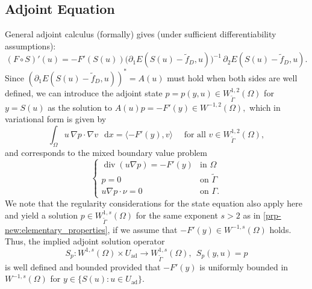 \documentclass[11pt]{article}
\newcommand*\dd{\mathop{}\!\mathrm{d}}
\newcommand{\feas}{U_{\textrm{ad}}}
\theoremstyle{definition}
\theoremstyle{remark}
\begin{document}
\subsection{Adjoint Equation}

General adjoint calculus (formally) gives (under sufficient differentiability assumptions):
\[ (F \circ S)'(u) = -
F'(S(u))
\bigl(\partial_1 E(S(u)-\tilde f_D,u)\bigr)^{-1}\,
\partial_2 E(S(u)-\tilde f_D,u).
\]
%
Since
$(\partial_1 E(S(u)-\tilde f_D,u))^* = A(u)$
must hold when both sides are well defined, we can introduce the adjoint 
state $p = p(y,u) \in W^{1,2}_{\tilde{\Gamma}}(\Omega)$ for $y = S(u)$
as the solution to
$ A(u)p = -F'(y) \in W^{-1,2}(\Omega), $
which in variational form is given by
%
\[
\int_\Omega u\,\nabla p\cdot\nabla v\,\dd x
= \langle - F'(y), v\rangle
\quad\text{ for all }v\in W^{1,2}_{\tilde{\Gamma}}(\Omega),
\]
%
and corresponds to the mixed boundary value problem
%
\begin{equation}\label{eq:adjoint}
\begin{cases}
\operatorname{div}(u\nabla p) = - F'(y)
& \text{in }\Omega\\
p = 0 &\text{on }\tilde\Gamma\\
u \nabla p\cdot\nu = 0 &\text{on }\Gamma.
\end{cases}
\end{equation}
%
We note that the regularity considerations for the state
equation also apply here and yield a solution
$p\in W^{1,s}_{\tilde\Gamma}(\Omega)$ for the same exponent $s>2$ as in \cref{prp-new:elementary_properties}, 
if we assume that $-F'(y) \in W^{-1,s}(\Omega)$ holds. Thus, the implied adjoint solution
operator
%
\[
S_p : W^{1,s} (\Omega) \times \feas  \to  W^{1,s}_{\tilde\Gamma}(\Omega),\ \  S_p(y,u) = p
\]
%
is well defined and bounded provided that $-F'(y)$ is uniformly
bounded in $W^{-1,s}(\Omega)$ for $y \in \{ S(u) : u \in \feas\}$.
\end{document}
